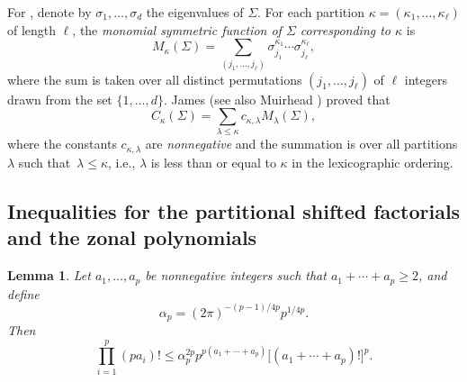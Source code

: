 \documentclass[pdftex]{sigma}
\numberwithin{equation}{section}
\newtheorem{Lemma}[Theorem]{Lemma}
\def\R {\mathbb{R}}
\newcommand{\sym}{{{\hskip-1pt}\mathop{\mathrm{sym}}}}
\begin{document}
For \smash{$\Sigma \in \R^{d \times d}_\sym$}, denote by $\sigma_1,\ldots,\sigma_d$ the eigenvalues of $\Sigma$. For each partition $\kappa = (\kappa_1,\ldots,\kappa_\ell)$ of length $\ell$, the {\it monomial symmetric function of $\Sigma$ corresponding to $\kappa$} is
\begin{equation}
\label{eq_msf}
M_\kappa(\Sigma) = \sum_{(j_1,\ldots,j_\ell)} \sigma_{j_1}^{\kappa_1} \cdots \sigma_{j_\ell}^{\kappa_\ell},
\end{equation}
where the sum is taken over all distinct permutations $(j_1,\ldots,j_\ell)$ of $\ell$ integers drawn from the set $\{1,\ldots,d\}$. James \cite{James68} (see also Muirhead \cite[Section 7.2]{Muirhead}) proved that
\begin{equation}
\label{eq_zonal_msf}
C_\kappa(\Sigma) = \sum_{\lambda \le \kappa} c_{\kappa,\lambda} M_\lambda(\Sigma),
\end{equation}
where the constants $c_{\kappa,\lambda}$ are \textit{nonnegative} and the summation is over all partitions $\lambda$ such that~${\lambda \le \kappa}$, i.e., $\lambda$ is less than or equal to $\kappa$ in the lexicographic ordering.


\subsection[Inequalities for the partitional shifted factorials and the zonal polynomials]{Inequalities for the partitional shifted factorials\\ and the zonal polynomials}
\label{sec_ineqs}

\begin{Lemma}
\label{lemma_factorial_ineq}
Let $a_1,\ldots,a_p$ be nonnegative integers such that $a_1+\cdots+a_p\ge 2$, and define
\begin{equation}
\label{eq_alpha_p}
\alpha_p = (2\pi)^{-(p-1)/4p} p^{1/4p}.
\end{equation}
Then
\begin{equation}
\label{eq_prod_factorial_bound}
\prod_{i=1}^p (p a_i)! \le \alpha_p^{2p} p^{p(a_1+\cdots+a_p)} \bigl[(a_1+\cdots+a_p)!\bigr]^p.
\end{equation}
\end{Lemma}
\end{document}
